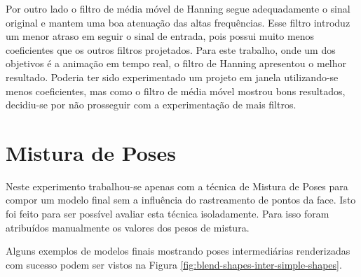 Por outro lado o filtro de média móvel de Hanning segue adequadamente o sinal
original e mantem uma boa atenuação das altas frequências. Esse filtro introduz
um menor atraso em seguir o sinal de entrada, pois possui muito menos
coeficientes que os outros filtros projetados. Para este trabalho, onde um dos
objetivos é a animação em tempo real, o filtro de Hanning apresentou o melhor
resultado. Poderia ter sido experimentado um projeto em janela utilizando-se
menos coeficientes, mas como o filtro de média móvel mostrou bons resultados,
decidiu-se por não prosseguir com a experimentação de mais filtros.

\section{Mistura de Poses}

Neste experimento trabalhou-se apenas com a técnica de Mistura de Poses para
compor um modelo final sem a influência do rastreamento de pontos da face. Isto
foi feito para ser possível avaliar esta técnica isoladamente. Para isso foram
atribuídos manualmente os valores dos pesos de mistura.

Alguns exemplos de modelos finais mostrando poses intermediárias renderizadas
com sucesso podem ser vistos na Figura
\ref{fig:blend-shapes-inter-simple-shapes}.

